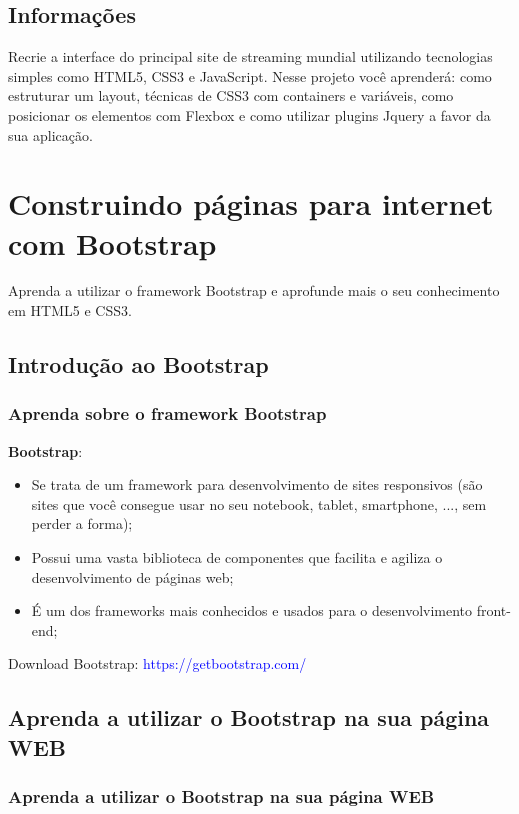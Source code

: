 \documentclass[12pt,a4paper]{article}
\begin{document}
	\subsection{Informações}
	
	Recrie a interface do principal site de streaming mundial utilizando tecnologias simples como HTML5, CSS3 e JavaScript. Nesse projeto você aprenderá: como estruturar um layout, técnicas de CSS3 com containers e variáveis, como posicionar os elementos com Flexbox e como utilizar plugins Jquery a favor da sua aplicação.
	
	\section{Construindo páginas para internet com Bootstrap}
	
	Aprenda a utilizar o framework Bootstrap e aprofunde mais o seu conhecimento em HTML5 e CSS3.
	
	\subsection{Introdução ao Bootstrap}
	\subsubsection{Aprenda sobre o framework Bootstrap}
	
	\textbf{Bootstrap}: 
	
	\begin{itemize}
		\item Se trata de um framework para desenvolvimento de sites responsivos (são sites que você consegue usar no seu notebook, tablet, smartphone, ..., sem perder a forma);
		\item Possui uma vasta biblioteca de componentes que facilita e agiliza o desenvolvimento de páginas web;
		\item É um dos frameworks mais conhecidos e usados para o desenvolvimento front-end;
	\end{itemize}

	Download Bootstrap: \textcolor{blue}{https://getbootstrap.com/} 
	
	\subsection{Aprenda a utilizar o Bootstrap na sua página WEB}
	\subsubsection{Aprenda a utilizar o Bootstrap na sua página WEB}
	
\end{document}
